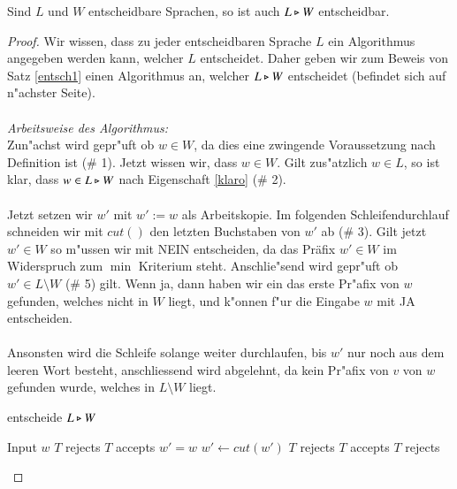 \begin{satz}\label{entsch1}
Sind $L$ und $W$ entscheidbare Sprachen, so ist auch $L\triangleright W$ entscheidbar.
\end{satz}
\begin{proof}
Wir wissen, dass zu jeder entscheidbaren Sprache $L$ ein Algorithmus angegeben werden kann, welcher $L$ entscheidet. Daher geben wir zum Beweis von Satz \ref{entsch1} einen Algorithmus an, welcher $L\triangleright W$ entscheidet (befindet sich auf n"achster Seite).\\\\
\emph{Arbeitsweise des Algorithmus:}\\
Zun"achst wird gepr"uft ob $w\in W$, da dies eine zwingende Voraussetzung nach Definition ist (\# 1).
Jetzt wissen wir, dass $w\in W$. Gilt zus"atzlich $w\in L$, so ist klar, dass $w\in L\triangleright W$ nach Eigenschaft \ref{klaro} (\# 2).\\\\
Jetzt setzen wir $w'$ mit $w':=w$ als Arbeitskopie. Im folgenden Schleifendurchlauf schneiden wir mit $cut()$ den letzten Buchstaben von $w'$ ab (\# 3). 
Gilt jetzt $w'\in W$ so m"ussen wir mit NEIN entscheiden, da das Präfix $w'\in W$ im Widerspruch zum $\min$ Kriterium steht.
Anschlie"send wird gepr"uft ob $w'\in L\setminus W$ (\# 5) gilt. Wenn ja, dann haben wir ein das erste Pr"afix von $w$ gefunden, welches nicht in $W$ liegt, und k"onnen f"ur die Eingabe $w$ mit JA entscheiden.
\\\\Ansonsten wird die Schleife solange weiter durchlaufen, bis $w'$ nur noch aus dem leeren Wort besteht, anschliessend wird abgelehnt, da kein Pr"afix von $v$ von $w$ gefunden wurde, welches in $L\setminus W$ liegt.
\begin{algorithm}
\caption{entscheide $L\triangleright W$}
\label{split}
\begin{algorithmic}
\STATE Input $w$
\STATE $T$ rejects 
\ELSE
{}
\STATE $T$ accepts  
\ENDIF
\ENDIF
\STATE $w' = w$  
\REPEAT
\STATE $w' \leftarrow \mathit{cut}(w')$ 
\STATE $T$ rejects
\ENDIF
{}
\STATE $T$ accepts
\ENDIF
{}
\STATE $T$ rejects
\end{algorithmic}
\end{algorithm}

\end{proof}


